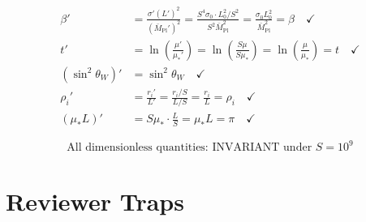 \documentclass[11pt,a4paper]{article}
\theoremstyle{definition}
\begin{document}
\begin{align}
\label{eq:verify_beta}
\beta' &= \frac{\sigma' (L')^2}{(\bar{M}_{\text{Pl}}')^2} = \frac{S^4 \sigma_0 \cdot L_0^2/S^2}{S^2 \bar{M}_{\text{Pl}}^2} = \frac{\sigma_0 L_0^2}{\bar{M}_{\text{Pl}}^2} = \beta \quad \checkmark \\
\label{eq:verify_t}
t' &= \ln\left(\frac{\mu'}{\mu_*'}\right) = \ln\left(\frac{S\mu}{S\mu_*}\right) = \ln\left(\frac{\mu}{\mu_*}\right) = t \quad \checkmark \\
\label{eq:verify_sw2}
(\sin^2\theta_W)' &= \sin^2\theta_W \quad \checkmark \\
\label{eq:verify_rho}
\rho_i' &= \frac{r_i'}{L'} = \frac{r_i/S}{L/S} = \frac{r_i}{L} = \rho_i \quad \checkmark \\
\label{eq:verify_muL}
(\mu_* L)' &= S\mu_* \cdot \frac{L}{S} = \mu_* L = \pi \quad \checkmark
\end{align}

\begin{equation}
\label{eq:invariance_summary}
\text{All dimensionless quantities: INVARIANT under } S = 10^9
\end{equation}

\section{Reviewer Traps}
\label{sec:traps}
\end{document}
